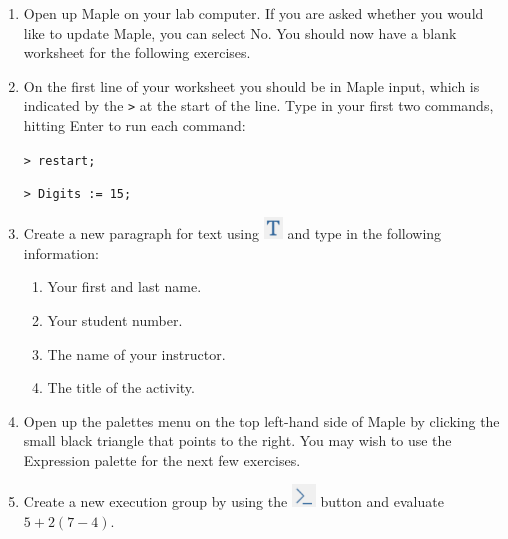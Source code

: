 \begin{enumerate}
	\item Open up Maple on your lab computer. If you are asked whether you would like to update Maple, you can select No. You should now have a blank worksheet for the following exercises.
		
	\item On the first line of your worksheet you should be in Maple input, which is indicated by the \texttt{>} at the start of the line. Type in your first two commands, hitting Enter to run each command:
		\par \texttt{> restart;} 
		\par \texttt{> Digits := 15;}
		
	\item Create a new paragraph for text using \includegraphics[width=0.04\textwidth]{tutorials/figures/new_text.png} and type in the following information:
	\begin{enumerate}
		\item Your first and last name.
		\item Your student number.
		\item The name of your instructor.
		\item The title of the activity.
	\end{enumerate}
	
	\item Open up the palettes menu on the top left-hand side of Maple by clicking the small black triangle that points to the right. You may wish to use the Expression palette for the next few exercises.
	
    \item \label{ex-maple-input} Create a new execution group by using the \includegraphics[width=0.05\textwidth]{tutorials/figures/new_input.PNG} button and evaluate $5 + 2(7-4)$.
    

\end{enumerate}
